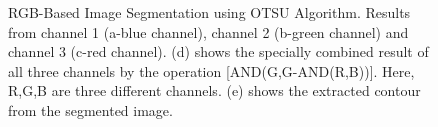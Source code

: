 \documentclass{article}
\begin{document}
\begin{figure}[!htbp]
     \centering
    \captionsetup[subfigure]{labelformat=empty}
    \caption{RGB-Based Image Segmentation using OTSU Algorithm. Results from channel 1 (a-blue channel), channel 2 (b-green channel) and channel 3 (c-red channel). (d) shows the specially combined result of all three channels by the operation [AND(G,G-AND(R,B))]. Here, R,G,B are three different channels. (e) shows the extracted contour from the segmented image.}
    \label{fig:car_2}
\end{figure}
\end{document}
